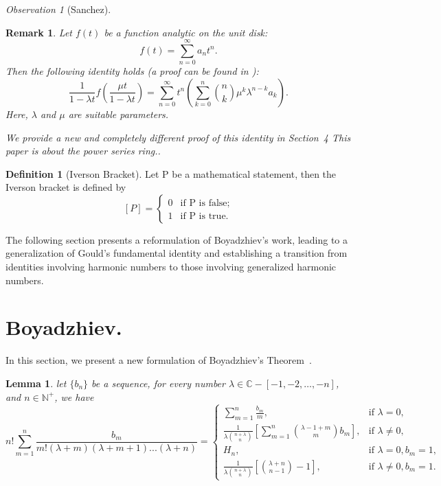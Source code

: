 \documentclass[a4paper,10pt,oneside]{article}
\newcommand{\BBN}{{\mathbb N}}
\newcommand{\BBC}{{\mathbb C}}
\newtheorem{remark}{Remark}[section]
\newtheorem{lemma}{Lemma}[section]
\theoremstyle{definition}
\newtheorem{definition}[theorem]{Definition}
\theoremstyle{remark}
\newtheorem{observation}[theorem]{Observation}
\begin{document}
\begin{description}
\begin{observation}[Sanchez\cite{sanchez}]
 \end{observation}
 \item 
 
\begin{remark}\label{remarkboyad}
Let \( f(t) \) be a function analytic on the unit disk:
\begin{equation}
f(t) = \sum_{n=0}^{\infty} a_n t^n. \label{gould1}
\end{equation}
Then the following identity holds (a proof can be found in \cite{khristo3}):
\begin{equation}
\frac{1}{1 - \lambda t} f\left( \frac{\mu t}{1 - \lambda t} \right) = \sum_{n=0}^{\infty} t^n \left( \sum_{k=0}^n \binom{n}{k} \mu^k \lambda^{n-k} a_k \right). \label{gouldboya1}
\end{equation}
Here, \( \lambda \) and \( \mu \) are suitable parameters.\par 

{We provide a new and completely different proof of this identity in Section~4 This paper is about the power series ring..}
\end{remark}
\item 
\begin{definition}[Iverson Bracket]
 Let P be a mathematical statement, then the Iverson bracket is defined by
$$[P]=\begin{cases}
0& \text{if  P is false}; \\ 
1& \text{if  P is true}.
\end{cases}$$
\end{definition}
\end{description}
The following section presents a reformulation of Boyadzhiev's work, leading to a generalization of Gould’s fundamental identity and establishing a transition from identities involving harmonic numbers to those involving generalized harmonic numbers.
{\section{Boyadzhiev.}}
In this section, we present a new formulation of Boyadzhiev's Theorem~\cite{khristo}.
\begin{lemma} \label{lemma}
  let $\{b_n\}$  be  a sequence, for every number $\lambda\in\BBC-[-1,-2,\dots,-n]$, and  $n\in \BBN^+$, we have 
\begin{equation}
n!\sum_{m=1}^n\frac{b_m}{m!(\lambda +m)(\lambda +m+1)...(\lambda +n)}=\begin{cases}\sum_{m=1}^n\frac{b_m}{m},&{\text{if }\lambda=0},\\
\frac{1}{\lambda \binom{n+\lambda}{n}}[\sum_{m=1}^{n}\binom{\lambda-1+m}{m}b_m],&{\text{if }\lambda\ne 0},\\
H_n,&{\text{if }\lambda=0,b_m=1},\\
\frac{1}{\lambda \binom{n+\lambda}{n}}[\binom{\lambda+n}{n-1}-1],&{\text{if } \lambda \ne 0,b_m=1.}
\label{lemmaeq0}
\end{cases}
\end{equation}
\end{lemma}
\end{document}
